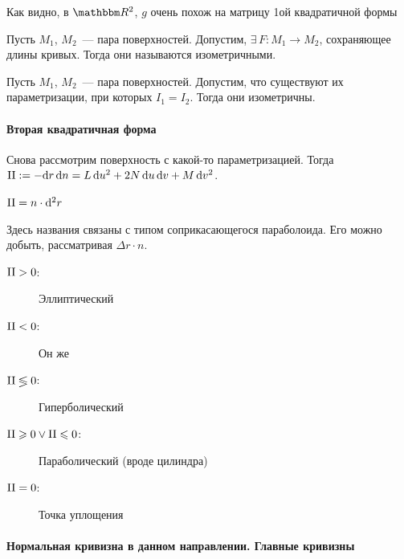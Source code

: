 \documentclass[draft,timbord]{longnotes}
\begin{document}
\begin{rem}
  Как видно, в $\R^2$, $g$ очень похож на матрицу 1ой квадратичной формы
\end{rem}

\begin{defn}\label{defn:dg::area::isom}
  Пусть $M_1$, $M_2$~--- пара поверхностей. Допустим, $\exists\, F \colon M_1 \to M_2$, 
  сохраняющее длины кривых. Тогда они называются  изометричными.
\end{defn}

\begin{thrm}\label{thrm:dg::area::Iisom}
  Пусть $M_1$, $M_2$~--- пара поверхностей. Допустим, что существуют их параметризации, 
  при которых $I_1= I_2$. Тогда они изометричны.
\end{thrm}

\paragraph{Вторая квадратичная форма}
\label{par:dg::II}

\begin{defn}\label{defn:dg::II}
  Снова рассмотрим поверхность с  какой-то параметризацией. Тогда 
  ${\rm II} := - \mathrm{d} r \, \mathrm{d} n = L \, \mathrm{d} u^2 + 2N\, \mathrm{d} u \,\mathrm{d} v + M\, \mathrm{d} v^2$.
\end{defn}

\begin{prop}\label{prop:dg::II}
  ${\rm II} = n \cdot \mathrm{d}^2 r$
\end{prop}

\begin{prop}\label{prop:dg::II::ptypes}
  Здесь названия связаны с типом соприкасающегося параболоида. Его можно добыть, рассматривая
  $\Delta r \cdot n$.
  \begin{description}
    \item[${\rm II} > 0$:] Эллиптический
    \item[${\rm II} < 0$:] Он же
    \item[${\rm II} \lessgtr 0$:] Гиперболический
    \item[${\rm II} \geqslant 0 \lor {\rm II} \leqslant 0$:] Параболический (вроде цилиндра)
    \item[${\rm II} = 0$:] Точка уплощения
  \end{description}
\end{prop}


\paragraph{Нормальная кривизна в данном направлении. Главные кривизны}
\label{par:meas::curfctr}
\end{document}
